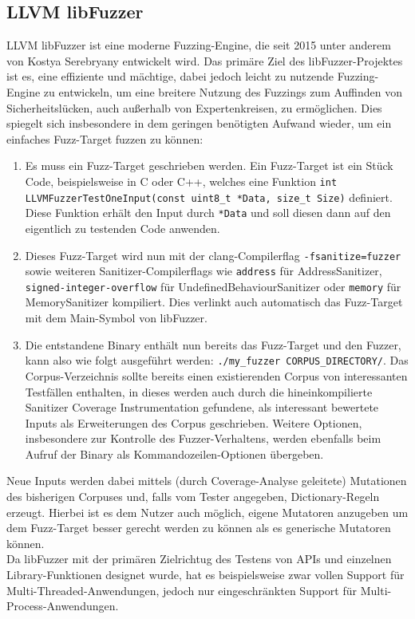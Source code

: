 \documentclass[a4paper]{article}
\begin{document}
\subsection{LLVM libFuzzer}
LLVM libFuzzer\cite{libfuzzer} ist eine moderne Fuzzing-Engine, die seit 2015 unter anderem von Kostya Serebryany entwickelt wird\cite{newlibfuzzer}. 
Das primäre Ziel des libFuzzer-Projektes ist es, eine effiziente und mächtige, dabei jedoch leicht zu nutzende Fuzzing-Engine zu entwickeln, um eine breitere Nutzung des Fuzzings zum Auffinden von Sicherheitslücken, auch außerhalb von Expertenkreisen, zu ermöglichen. 
Dies spiegelt sich insbesondere in dem geringen benötigten Aufwand wieder, um ein einfaches Fuzz-Target fuzzen zu können:
\begin{enumerate}
    \item Es muss ein Fuzz-Target geschrieben werden. Ein Fuzz-Target ist ein Stück Code, beispielsweise in C oder C++, welches eine Funktion \texttt{int LLVMFuzzerTestOneInput(const uint8\_t *Data, size\_t Size)} definiert. Diese Funktion erhält den Input durch \texttt{*Data} und soll diesen dann auf den eigentlich zu testenden Code anwenden.
    \item Dieses Fuzz-Target wird nun mit der clang-Compilerflag \texttt{-fsanitize=fuzzer} sowie weiteren Sanitizer-Compilerflags wie \texttt{address} für AddressSanitizer, \texttt{signed-integer-overflow} für UndefinedBehaviourSanitizer oder \texttt{memory} für MemorySanitizer kompiliert.
        Dies verlinkt auch automatisch das Fuzz-Target mit dem Main-Symbol von libFuzzer.
    \item Die entstandene Binary enthält nun bereits das Fuzz-Target und den Fuzzer, kann also wie folgt ausgeführt werden: \texttt{./my\_fuzzer CORPUS\_DIRECTORY/}. Das Corpus-Verzeichnis sollte bereits einen existierenden Corpus von interessanten Testfällen enthalten, in dieses werden auch durch die hineinkompilierte Sanitizer Coverage Instrumentation\cite{newlibfuzzer} gefundene, als interessant bewertete Inputs als Erweiterungen des Corpus geschrieben.
        Weitere Optionen, insbesondere zur Kontrolle des Fuzzer-Verhaltens, werden ebenfalls beim Aufruf der Binary als Kommandozeilen-Optionen übergeben.
\end{enumerate}
Neue Inputs werden dabei mittels (durch Coverage-Analyse geleitete) Mutationen des bisherigen Corpuses und, falls vom Tester angegeben, Dictionary-Regeln erzeugt. 
Hierbei ist es dem Nutzer auch möglich, eigene Mutatoren anzugeben um dem Fuzz-Target besser gerecht werden zu können als es generische Mutatoren können.\\
Da libFuzzer mit der primären Zielrichtug des Testens von APIs und einzelnen Library-Funktionen designet wurde, hat es beispielsweise zwar vollen Support für Multi-Threaded-Anwendungen, jedoch nur eingeschränkten Support für Multi-Process-Anwendungen.
\end{document}
